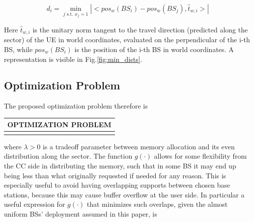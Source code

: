 \documentclass[conference,10pt]{IEEEtran}
\begin{document}
\begin{equation}
\label{eq:dists}
d_i = \min_{j \textrm{ s.t. }x_j = 1} |<pos_w(BS_i) - pos_w(BS_j), \hat{t}_{w, i}>|
\end{equation} 

Here $\hat{t}_{w, i}$ is the unitary norm tangent to the travel direction (predicted along the sector) of the UE in world coordinates, evaluated on the perpendicular of the i-th BS, while $pos_w(BS_i)$ is the position of the i-th BS in world coordinates. A representation is visible in Fig.\ref{fig:min_dists}.

\subsection{Optimization Problem}

The proposed optimization problem therefore is

\begin{center}
	\begin{tabular}[h]{|c|}
		
		\hline
		OPTIMIZATION PROBLEM \\
		\hline
		\makebox[8.6cm]{
			$			
			\begin{array}{l l l l l l}
				\null \\
				\mathbf{x} \in \underset{\mathbf{x} \in \{0,1\}^N}{argmax} {\textrm{ } \sum_i{g_i(m)x_ie^{-\frac{(\mathbf{S}^T\mathbf{x} - 1000)^2}{2}}} - \lambda\left(\frac{\mathbf{d}^T\mathbf{x}}{2} - 1000\right)^2} \\[3ex]
				\textrm{such that:}\\[0.5ex]	
				\sum_i{g_i(m)x_i} \le F\\[0.5ex]		
				0  < g_i(m) \le min(m, \Omega) \textrm{ } \forall i \textrm{ s.t. } x_i  = 1 \textrm{,   0 otherwise}
				\null \\[2ex]
			\end{array}
			$
		}\\
		\hline
	\end{tabular}
\end{center}

where $\lambda > 0$ is a tradeoff parameter between memory allocation and its even distribution along the sector. The function $g(\cdot)$ allows for some flexibility from the CC side in distributing the memory, such that in some BS it may end up being less than what originally requested if needed for any reason. This is especially useful to avoid having overlapping supports between chosen base stations, because this may cause buffer overflow at the user side. In particular a useful expression for $g(\cdot)$ that minimizes such overlaps, given the almost uniform BSs' deployment assumed in this paper, is 
\end{document}

